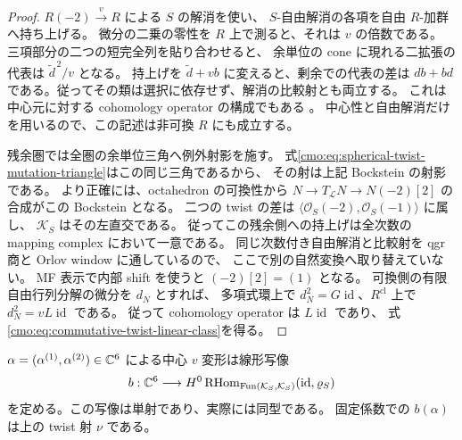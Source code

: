 \begin{proof}
$R(-2)\xrightarrow{v}R$ による $S$ の解消を使い、
$S$-自由解消の各項を自由 $R$-加群へ持ち上げる。
微分の二乗の零性を $R$ 上で測ると、それは $v$ の倍数である。
三項部分の二つの短完全列を貼り合わせると、
余単位の cone に現れる二拡張の代表は $\widetilde d^{\,2}/v$ となる。
持上げを $\widetilde d+vb$ に変えると、剰余での代表の差は
$db+bd$ である。従ってその類は選択に依存せず、解消の比較射とも両立する。
これは中心元に対する cohomology operator の構成でもある
\cite[Construction~4.1.1]{CMOEisenbudPeeva}。
中心性と自由解消だけを用いるので、この記述は非可換 $R$ にも成立する。

残余圏では全圏の余単位三角へ例外射影を施す。
式\eqref{cmo:eq:spherical-twist-mutation-triangle}はこの同じ三角であるから、
その射は上記 Bockstein の射影である。
より正確には、octahedron の可換性から
$N\to T_{\mathcal L}N\to N(-2)[2]$ の合成がこの Bockstein となる。
二つの twist の差は
$\langle\mathcal O_S(-2),\mathcal O_S(-1)\rangle$ に属し、
$\mathcal K_S$ はその左直交である。
従ってこの残余側への持上げは全次数の mapping complex において一意である。
同じ次数付き自由解消と比較射を qgr 商と Orlov window に通しているので、
ここで別の自然変換へ取り替えていない。
MF 表示で内部 shift を使うと $(-2)[2]=(1)$ となる。
可換側の有限自由行列分解の微分を $d_N$ とすれば、
多項式環上で $d_N^2=G\operatorname{id}$、$R^{\mathrm{cl}}$ 上で
$d_N^2=vL\operatorname{id}$ である。
従って cohomology operator は $L\operatorname{id}$ であり、
式\eqref{cmo:eq:commutative-twist-linear-class}を得る。
\end{proof}
\begin{lemma}[六つの係数の非零な境界類]
\label{cmo:lem:boundary-parameter-injection}
$\alpha=(\alpha^{(1)},\alpha^{(2)})\in\mathbb C^6$ による中心 $v$ 変形は線形写像
\begin{equation}\label{cmo:eq:boundary-parameter-map}
 b:\mathbb C^6\longrightarrow
 H^0\operatorname{RHom}_{\operatorname{Fun}(\mathcal K_S,\mathcal K_S)}
       (\operatorname{id},\varrho_S)
\end{equation}
を定める。この写像は単射であり、実際には同型である。
固定係数での $b(\alpha)$ は上の twist 射 $\nu$ である。
\end{lemma}

